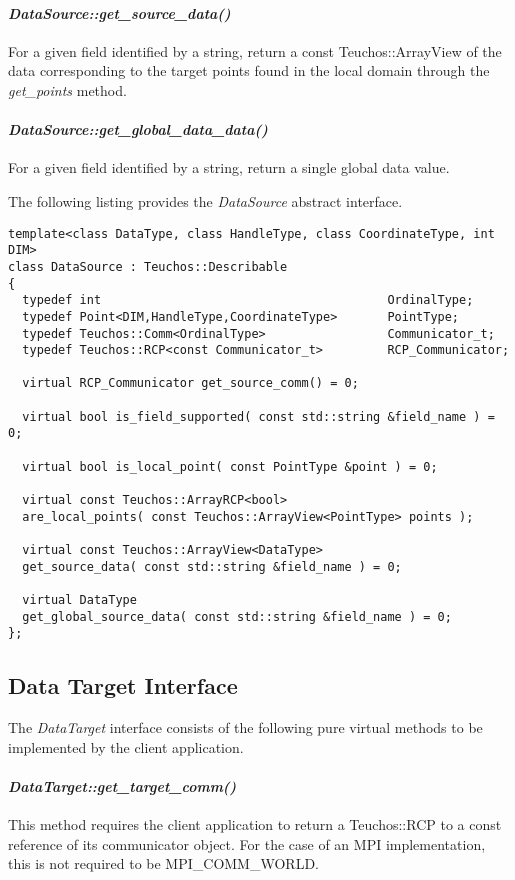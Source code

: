 \documentclass[letterpaper]{article}
\begin{document}
\paragraph{\sl DataSource::get\_source\_data()}
For a given field identified by a string, return a const
Teuchos::ArrayView of the data corresponding to the target points
found in the local domain through the {\sl get\_points} method.

\paragraph{\sl DataSource::get\_global\_data\_data()}
For a given field identified by a string, return a single global data
value.

The following listing provides the {\sl DataSource} abstract
interface. 

\begin{lstlisting}
template<class DataType, class HandleType, class CoordinateType, int DIM>
class DataSource : Teuchos::Describable
{
  typedef int                                        OrdinalType;
  typedef Point<DIM,HandleType,CoordinateType>       PointType;
  typedef Teuchos::Comm<OrdinalType>                 Communicator_t;
  typedef Teuchos::RCP<const Communicator_t>         RCP_Communicator;

  virtual RCP_Communicator get_source_comm() = 0;

  virtual bool is_field_supported( const std::string &field_name ) = 0;

  virtual bool is_local_point( const PointType &point ) = 0;

  virtual const Teuchos::ArrayRCP<bool> 
  are_local_points( const Teuchos::ArrayView<PointType> points );

  virtual const Teuchos::ArrayView<DataType> 
  get_source_data( const std::string &field_name ) = 0;

  virtual DataType 
  get_global_source_data( const std::string &field_name ) = 0;
};
\end{lstlisting}

\subsection{Data Target Interface}
The {\sl DataTarget} interface consists of the following pure
virtual methods to be implemented by the client application.

\paragraph{\sl DataTarget::get\_target\_comm()}
This method requires the client application to return a Teuchos::RCP
to a const reference of its communicator object. For the case of an
MPI implementation, this is not required to be MPI\_COMM\_WORLD.
\end{document}
